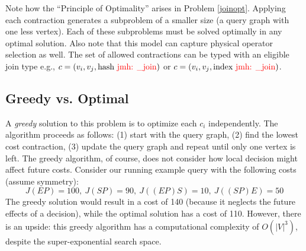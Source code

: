 Note how the ``Principle of Optimality'' arises in Problem \ref{joinopt}. Applying each contraction generates a subproblem of a smaller size (a query graph with one less vertex). Each of these subproblems must be solved optimally in any optimal solution. Also note that this model can  capture physical operator selection as well. The set of allowed contractions can be typed with an eligible join type e.g., $c=(v_i, v_j, \text{hash {\color{red}jmh: \_join}})$ or $c=(v_i, v_j, \text{index {\color{red}jmh: \_join}})$.

\subsection{Greedy vs. Optimal}

A \emph{greedy} solution to this problem is to optimize each $c_i$ independently. The algorithm proceeds as follows: (1) start with the query graph, (2) find the lowest cost contraction, (3) update the query graph and repeat until only one vertex is left. The greedy algorithm, of course, does not consider how local decision might affect future costs. Consider our running example query with the following costs (assume symmetry):
\[J(EP)= 100,~J(SP)= 90,~J((EP)S)= 10,~J((SP)E)= 50\]
The greedy solution would result in a cost of 140 (because it neglects the future effects of a decision), while the optimal solution has a cost of 110.
However, there is an upside: this greedy algorithm has a computational complexity of $O(|V|^3)$, despite the super-exponential search space.

